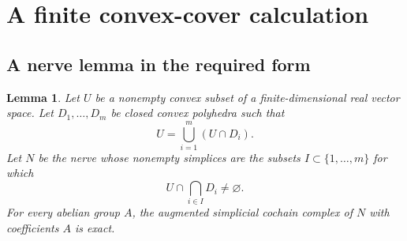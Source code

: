 \documentclass[11pt]{article}
\newtheorem{lemma}[theorem]{Lemma}
\theoremstyle{definition}
\theoremstyle{remark}
\begin{document}
\section{A finite convex-cover calculation}

\subsection{A nerve lemma in the required form}

\begin{lemma}\label{lem:convex-nerve}
Let \(U\) be a nonempty convex subset of a finite-dimensional real
vector space. Let \(D_1,\ldots,D_m\) be closed convex polyhedra such
that
\[
U=\bigcup_{i=1}^m(U\cap D_i).
\]
Let \(N\) be the nerve whose nonempty simplices are the subsets
\(I\subset\{1,\ldots,m\}\) for which
\[
U\cap\bigcap_{i\in I}D_i\ne\varnothing.
\]
For every abelian group \(A\), the augmented simplicial cochain
complex of \(N\) with coefficients \(A\) is exact.
\end{lemma}
\end{document}
